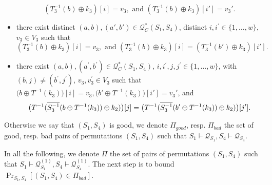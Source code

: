 \begin{definition}
\begin{itemize}
		$$\left(T_{3}^{-1}\left(b\right) \oplus k_{3}\right)[i] = v_3,\text{ and }
		\left(T_{3}^{-1}\left(b\right) \oplus k_{3}\right)[i'] = v_3'.$$
		\item[\ceight]
		there exist distinct $(a, b),(a',b') \in \mathcal{Q}_{C}^{*}\left(S_{1}, S_{4}\right)$, distinct $i, i^{\prime}\in\{1, \ldots, w\}$, $v_{3} \in V_{3}$ such that
		$$\left(T_{3}^{-1}\left(b\right) \oplus k_{3}\right)[i] = v_3,\text{ and }
		\left(T_{3}^{-1}\left(b\right) \oplus k_{3}\right)[i] =\left(T_{3}^{-1}\left(b'\right) \oplus k_{3}\right)[i'].$$
		\item[\cnine]
		there exist $(a, b), (a^{\prime}, b^{\prime}) \in \mathcal{Q}_{C}^{*}\left(S_{1}, S_{4}\right)$, $i, i^{\prime}, j, j^{\prime} \in\{1, \ldots, w\}$, with $(b, j) \neq \left(b^{\prime}, j^{\prime}\right)$, $v_{3},v_{3}^{\prime} \in V_{3}$ such that $\big(b \oplus T^{-1}(k_3)\big)[i] = v_3, \big(b' \oplus T^{-1}(k_3)\big)[i'] = v_3'$, and
		$$\big(T^{-1}(\overline{S_3^{-1}}(b \oplus T^{-1}(k_3))\oplus k_2)\big)[j]=\big(T^{-1}(\overline{S_3^{-1}}(b' \oplus T^{-1}(k_3))\oplus k_2)\big)[j'].
		$$
	\end{itemize}
	Otherwise we say that $(S_{1}, S_{4})$ is good, we denote $\Pi_{good}$, resp. $\Pi_{bad}$ the set of good, resp. bad pairs of permutations $(S_{1}, S_{4})$ such that $S_{1} \vdash \mathcal{Q}_{S_{1}}, S_{4} \vdash \mathcal{Q}_{S_{4}}$.
\end{definition}




In all the following, we denote \emph{$\Pi$} the set of pairs of permutations $(S_{1}, S_{4})$ such that $S_{1} \vdash \mathcal{Q}_{S_{1}}^{(1)}, S_{4} \vdash \mathcal{Q}_{S_{4}}^{(1)}$. The next step is to bound $\operatorname{Pr}_{S_1,S_4}[(S_1,S_4) \in \Pi_{bad}]$.

